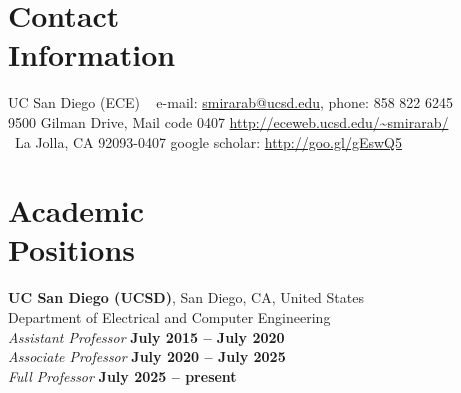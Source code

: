 \documentclass[margin,line,letterpaper]{resume}
\begin{document}
\begin{resume}

    \section{\mysidestyle Contact\\Information}
UC San Diego (ECE)  ~ \hfill e-mail: \url{smirarab@ucsd.edu},	phone: 858 822 6245   \vspace{0mm}\\\vspace{0mm} 
   9500 Gilman Drive, Mail code 0407  \hfill  \url{http://eceweb.ucsd.edu/~smirarab/}\vspace{0mm}\\\vspace{-4.5mm}%
   ~La Jolla, CA 92093-0407   	\hfill google scholar: \url{http://goo.gl/gEswQ5} \vspace{0mm}\\\vspace{-1.5mm}
   
      
    \section{\mysidestyle Academic\\Positions}

    \textbf{UC San Diego (UCSD)}, San Diego, CA, United States\\
    Department of Electrical and Computer Engineering\vspace{1mm}\\\vspace{0mm}%
    \textsl{Assistant Professor} \hfill \textbf{ July 2015 -- July 2020}\vspace{0mm}\\%
        \textsl{Associate Professor} \hfill \textbf{ July 2020 -- July 2025}\\
        \textsl{Full Professor} \hfill \textbf{ July 2025 -- present}\vspace{-3mm}\\
        \vspace{-4mm}%

\end{resume}
\end{document}
